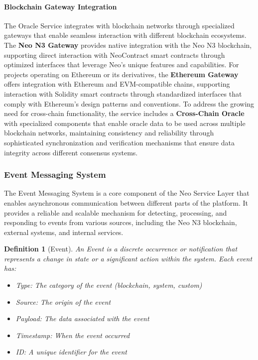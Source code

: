\documentclass[11pt]{article}
\newtheorem{definition}{Definition}
\begin{document}
\paragraph{Blockchain Gateway Integration}
The Oracle Service integrates with blockchain networks through specialized gateways that enable seamless interaction with different blockchain ecosystems. The \textbf{Neo N3 Gateway} provides native integration with the Neo N3 blockchain, supporting direct interaction with NeoContract smart contracts through optimized interfaces that leverage Neo's unique features and capabilities. For projects operating on Ethereum or its derivatives, the \textbf{Ethereum Gateway} offers integration with Ethereum and EVM-compatible chains, supporting interaction with Solidity smart contracts through standardized interfaces that comply with Ethereum's design patterns and conventions. To address the growing need for cross-chain functionality, the service includes a \textbf{Cross-Chain Oracle} with specialized components that enable oracle data to be used across multiple blockchain networks, maintaining consistency and reliability through sophisticated synchronization and verification mechanisms that ensure data integrity across different consensus systems.

\subsubsection{Event Messaging System}
\label{subsubsec:event-messaging}

The Event Messaging System is a core component of the Neo Service Layer that enables asynchronous communication between different parts of the platform. It provides a reliable and scalable mechanism for detecting, processing, and responding to events from various sources, including the Neo N3 blockchain, external systems, and internal services.



\begin{definition}[Event]
An Event is a discrete occurrence or notification that represents a change in state or a significant action within the system. Each event has:
\begin{itemize}
    \item Type: The category of the event (blockchain, system, custom)
    \item Source: The origin of the event
    \item Payload: The data associated with the event
    \item Timestamp: When the event occurred
    \item ID: A unique identifier for the event
\end{itemize}
\end{definition}
\end{document}
